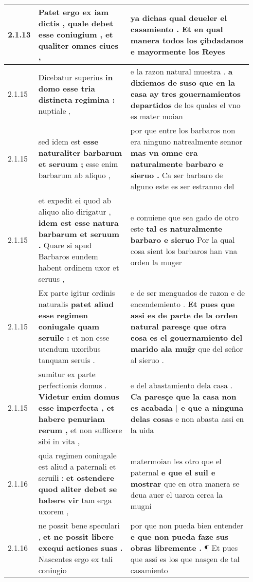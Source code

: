 \begin{tabular}{|p{1cm}|p{6.5cm}|p{6.5cm}|}
2.1.13 & Patet ergo ex iam dictis , \textbf{ quale debet esse coniugium , } et qualiter omnes ciues , & ya dichas qual deueler el casamiento . \textbf{ Et en qual manera todos los çibdadanos } e mayormente los Reyes \\\hline
2.1.15 & Dicebatur superius \textbf{ in domo esse tria distincta regimina : } nuptiale , & e la razon natural muestra . \textbf{ a dixiemos de suso que en la casa ay tres gouernamientos departidos } de los quales el vno es mater moian \\\hline
2.1.15 & sed idem est \textbf{ esse naturaliter barbarum et seruum ; } esse enim barbarum ab aliquo , & por que entre los barbaros non era ninguno natrealmente sennor \textbf{ mas vn omne era naturalmente barbaro e sieruo . } Ca ser barbaro de alguno este es ser estranno del \\\hline
2.1.15 & et expedit ei quod ab aliquo alio dirigatur , \textbf{ idem est esse natura barbarum et seruum . } Quare si apud Barbaros eundem habent ordinem uxor et seruus , & e conuiene que sea gado de otro este \textbf{ tal es naturalmente barbaro e sieruo } Por la qual cosa sient los barbaros han vna orden la muger \\\hline
2.1.15 & Ex parte igitur ordinis naturalis \textbf{ patet aliud esse regimen coniugale quam seruile : } et non esse utendum uxoribus tanquam seruis . & e de ser menguados de razon e de encendemiento . \textbf{ Et pues que assi es de parte de la orden natural paresçe que otra cosa es el gouernamiento del marido ala mug̃r } que del señor al sieruo . \\\hline
2.1.15 & sumitur ex parte perfectionis domus . \textbf{ Videtur enim domus esse imperfecta , et habere penuriam rerum , } et non sufficere sibi in vita , & e del abastamiento dela casa . \textbf{ Ca paresçe que la casa non es acabada | e que a ninguna delas cosas } e non abasta assi en la uida \\\hline
2.1.16 & quia regimen coniugale est aliud a paternali et seruili : \textbf{ et ostendere quod aliter debet se habere vir } tam erga uxorem , & matermoian les otro que el paternal \textbf{ e que el suil e mostrar } que en otra manera se deua auer el uaron cerca la mugni \\\hline
2.1.16 & ne possit bene speculari , \textbf{ et ne possit libere exequi actiones suas . } Nascentes ergo ex tali coniugio & por que non pueda bien entender \textbf{ e que non pueda faze sus obras libremente . } ¶ Et pues que assi es los que nasçen de tal casamiento \\\hline

\end{tabular}
